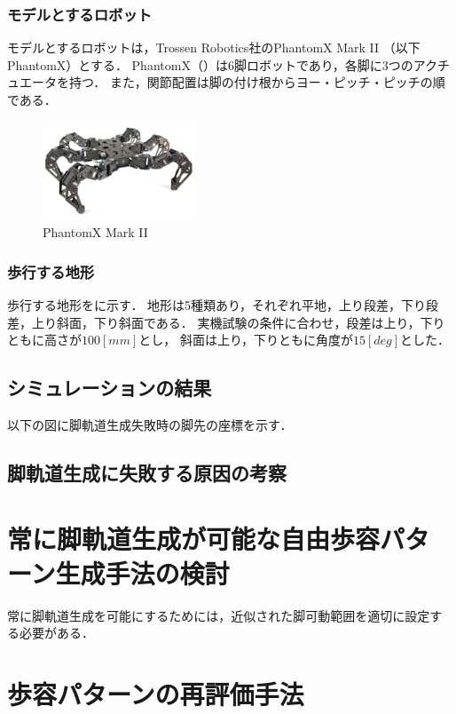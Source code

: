 \subsubsection{モデルとするロボット}
モデルとするロボットは，Trossen Robotics社のPhantomX Mark I\hspace{-1.2pt}I \cite{cita:phantom_x_mark_2}
（以下PhantomX）とする．
PhantomX（）は6脚ロボットであり，各脚に3つのアクチュエータを持つ．
また，関節配置は脚の付け根からヨー・ピッチ・ピッチの順である．

\begin{figure}[htbp]
  \begin{center}
    \includegraphics[width=45mm, clip]{figure/chapter2/phantomx_mk2.jpg}
    \caption{PhantomX Mark I\hspace{-1.2pt}I}
    \label{fig:phantomx_mk2} %
  \end{center}
\end{figure}

\subsubsection{歩行する地形}
歩行する地形をに示す．
地形は5種類あり，それぞれ平地，上り段差，下り段差，上り斜面，下り斜面である．
実機試験の条件に合わせ，段差は上り，下りともに高さが$100 [mm]$とし，
斜面は上り，下りともに角度が$15 [deg]$とした．

\subsection{シミュレーションの結果}
以下の図に脚軌道生成失敗時の脚先の座標を示す．

\subsection{脚軌道生成に失敗する原因の考察}

\section{常に脚軌道生成が可能な自由歩容パターン生成手法の検討}
常に脚軌道生成を可能にするためには，近似された脚可動範囲を適切に設定する必要がある．


\section{歩容パターンの再評価手法}

